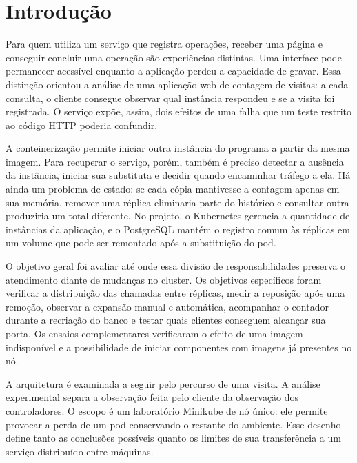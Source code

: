 \FloatBarrier\section{Introdução}
Para quem utiliza um serviço que registra operações, receber uma página e conseguir concluir uma operação são experiências distintas. Uma interface pode permanecer acessível enquanto a aplicação perdeu a capacidade de gravar. Essa distinção orientou a análise de uma aplicação web de contagem de visitas: a cada consulta, o cliente consegue observar qual instância respondeu e se a visita foi registrada. O serviço expõe, assim, dois efeitos de uma falha que um teste restrito ao código HTTP poderia confundir.

A conteinerização permite iniciar outra instância do programa a partir da mesma imagem. Para recuperar o serviço, porém, também é preciso detectar a ausência da instância, iniciar sua substituta e decidir quando encaminhar tráfego a ela. Há ainda um problema de estado: se cada cópia mantivesse a contagem apenas em sua memória, remover uma réplica eliminaria parte do histórico e consultar outra produziria um total diferente. No projeto, o Kubernetes gerencia a quantidade de instâncias da aplicação, e o PostgreSQL mantém o registro comum às réplicas em um volume que pode ser remontado após a substituição do pod.

O objetivo geral foi avaliar até onde essa divisão de responsabilidades preserva o atendimento diante de mudanças no cluster. Os objetivos específicos foram verificar a distribuição das chamadas entre réplicas, medir a reposição após uma remoção, observar a expansão manual e automática, acompanhar o contador durante a recriação do banco e testar quais clientes conseguem alcançar sua porta. Os ensaios complementares verificaram o efeito de uma imagem indisponível e a possibilidade de iniciar componentes com imagens já presentes no nó.

A arquitetura é examinada a seguir pelo percurso de uma visita. A análise experimental separa a observação feita pelo cliente da observação dos controladores. O escopo é um laboratório Minikube de nó único: ele permite provocar a perda de um pod conservando o restante do ambiente. Esse desenho define tanto as conclusões possíveis quanto os limites de sua transferência a um serviço distribuído entre máquinas.
